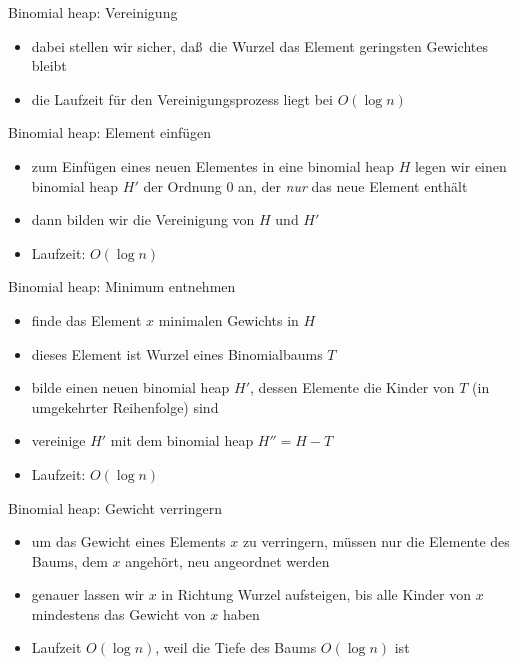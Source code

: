 \documentclass[aspectratio=1610, 11pt]{beamer}
\begin{document}
\begin{frame}
\begin{overprint}
		\begin{exampleblock}{Binomial heap: Vereinigung}
			\begin{itemize}
				\item dabei stellen wir sicher, da\ss\ die Wurzel das Element geringsten Gewichtes bleibt
				\item die Laufzeit f\"ur den Vereinigungsprozess liegt bei $O(\log n)$
			\end{itemize}
		\end{exampleblock}
		\begin{exampleblock}{Binomial heap: Element einf\"ugen}
			\begin{itemize}
				\item zum Einf\"ugen eines neuen Elementes in eine binomial heap $H$ legen wir einen binomial heap $H'$ der Ordnung $0$ an, der \emph{nur} das neue Element enth\"alt
				\item dann bilden wir die Vereinigung von $H$ und $H'$
				\item Laufzeit: $O(\log n)$
			\end{itemize}
		\end{exampleblock}
		\begin{exampleblock}{Binomial heap: Minimum entnehmen}
			\begin{itemize}
				\item finde das Element $x$ minimalen Gewichts in $H$
				\item dieses Element ist Wurzel eines Binomialbaums $T$
				\item bilde einen neuen binomial heap $H'$, dessen Elemente die Kinder von $T$ (in umgekehrter Reihenfolge) sind
				\item vereinige $H'$ mit dem binomial heap $H''=H-T$ 
				\item Laufzeit: $O(\log n)$
			\end{itemize}
		\end{exampleblock}
		\begin{exampleblock}{Binomial heap: Gewicht verringern}
			\begin{itemize}
				\item um das Gewicht eines Elements $x$ zu verringern, m\"ussen nur die Elemente des Baums, dem $x$ angeh\"ort, neu angeordnet werden
				\item genauer lassen wir $x$ in Richtung Wurzel aufsteigen, bis alle Kinder von $x$ mindestens das Gewicht von $x$ haben
				\item Laufzeit $O(\log n)$, weil die Tiefe des Baums $O(\log n)$ ist

\end{itemize}
\end{exampleblock}
\end{overprint}
\end{frame}
\end{document}
